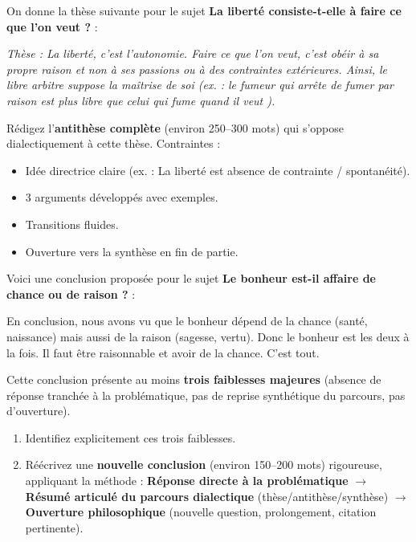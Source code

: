 \documentclass[11pt]{article}
\begin{document}
\begin{exercice}
On donne la thèse suivante pour le sujet \og \textbf{La liberté consiste-t-elle à faire ce que l'on veut ?} \fg{} :

\emph{Thèse : La liberté, c'est l'autonomie. Faire ce que l'on veut, c'est obéir à sa propre raison et non à ses passions ou à des contraintes extérieures. Ainsi, le libre arbitre suppose la maîtrise de soi (ex. : le fumeur qui arrête de fumer par raison est plus libre que celui qui fume \og quand il veut \fg{}).}

Rédigez l'\textbf{antithèse complète} (environ 250--300 mots) qui s'oppose dialectiquement à cette thèse.
Contraintes :
\begin{itemize}
\item Idée directrice claire (ex. : La liberté est absence de contrainte / spontanéité).
\item 3 arguments développés avec exemples.
\item Transitions fluides.
\item Ouverture vers la synthèse en fin de partie.
\end{itemize}
\end{exercice}

\begin{exercice}
Voici une conclusion proposée pour le sujet \og \textbf{Le bonheur est-il affaire de chance ou de raison ?} \fg{} :

\og En conclusion, nous avons vu que le bonheur dépend de la chance (santé, naissance) mais aussi de la raison (sagesse, vertu). Donc le bonheur est les deux à la fois. Il faut être raisonnable et avoir de la chance. C'est tout. \fg{}

Cette conclusion présente au moins \textbf{trois faiblesses majeures} (absence de réponse tranchée à la problématique, pas de reprise synthétique du parcours, pas d'ouverture).
\begin{enumerate}
\item Identifiez explicitement ces trois faiblesses.
\item Réécrivez une \textbf{nouvelle conclusion} (environ 150--200 mots) rigoureuse, appliquant la méthode : \textbf{Réponse directe à la problématique} $\rightarrow$ \textbf{Résumé articulé du parcours dialectique} (thèse/antithèse/synthèse) $\rightarrow$ \textbf{Ouverture philosophique} (nouvelle question, prolongement, citation pertinente).
\end{enumerate}
\end{exercice}
\end{document}
